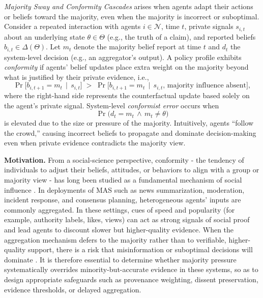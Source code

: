 \documentclass[11pt, letterpaper, shortlabels]{berkeley}
\begin{document}
{\begin{boxE}
\textit{Majority Sway and Conformity Cascades} arises when agents adapt their actions or beliefs toward the majority, even when the majority is incorrect or suboptimal. Consider a repeated interaction with agents $i \in \mathcal{N}$, time $t$, private signals $s_{i,t}$ about an underlying state $\theta \in \Theta$ (e.g., the truth of a claim), and reported beliefs $b_{i,t} \in \Delta(\Theta)$. Let $m_t$ denote the majority belief report at time $t$ and $d_t$ the system-level decision (e.g., an aggregator’s output). A policy profile exhibits \emph{conformity} if agents’ belief updates place extra weight on the majority beyond what is justified by their private evidence, i.e.,
\[
\Pr\!\big[b_{i,t+1} = m_t \,\mid\, s_{i,t}\big]
\;>\;
\Pr\!\big[b_{i,t+1} = m_t \,\mid\, s_{i,t},\, \text{majority influence absent}\big],
\]
where the right-hand side represents the counterfactual update based solely on the agent’s private signal. System-level \emph{conformist error} occurs when
\[
\Pr\big(d_t = m_t \,\wedge\, m_t \neq \theta\big)
\]
is elevated due to the size or pressure of the majority. Intuitively, agents “follow the crowd,” causing incorrect beliefs to propagate and dominate decision-making even when private evidence contradicts the majority view.
\end{boxE}

\textbf{Motivation.} From a social-science perspective, conformity - the tendency of individuals to adjust their beliefs, attitudes, or behaviors to align with a group or majority view - has long been studied as a fundamental mechanism of social influence \citep{asch1951effects, cialdini2004social, muchnik2013social, budak2011limiting}. In deployments of MAS such as news summarization, moderation, incident response, and consensus planning, heterogeneous agents’ inputs are commonly aggregated. In these settings, cues of speed and popularity (for example, authority labels, likes, views) can act as strong signals of social proof and lead agents to discount slower but higher-quality evidence. When the aggregation mechanism defers to the majority rather than to verifiable, higher-quality support, there is a risk that misinformation or suboptimal decisions will dominate \citep{ju2024flooding}. It is therefore essential to determine whether majority pressure systematically overrides minority-but-accurate evidence in these systems, so as to design appropriate safeguards such as provenance weighting, dissent preservation, evidence thresholds, or delayed aggregation.

}
\end{document}
